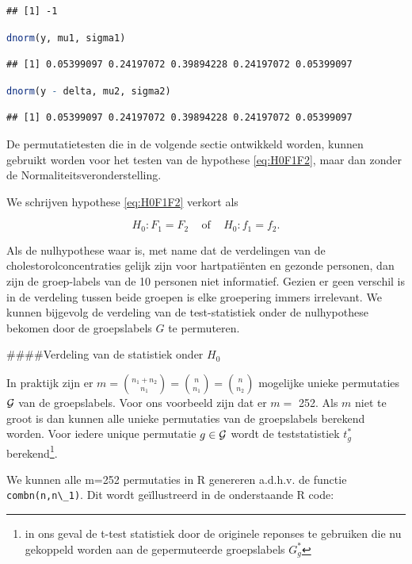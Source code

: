 \documentclass[
  12pt,dutch,coursenotes]{book}
\newcommand{\passthrough}[1]{#1}
\theoremstyle{definition}
\theoremstyle{definition}
\theoremstyle{definition}
\theoremstyle{definition}
\theoremstyle{remark}
\begin{document}
\begin{lstlisting}
## [1] -1
\end{lstlisting}

\begin{lstlisting}[language=R]
dnorm(y, mu1, sigma1)
\end{lstlisting}

\begin{lstlisting}
## [1] 0.05399097 0.24197072 0.39894228 0.24197072 0.05399097
\end{lstlisting}

\begin{lstlisting}[language=R]
dnorm(y - delta, mu2, sigma2)
\end{lstlisting}

\begin{lstlisting}
## [1] 0.05399097 0.24197072 0.39894228 0.24197072 0.05399097
\end{lstlisting}

De permutatietesten die in de volgende sectie ontwikkeld worden, kunnen gebruikt worden voor het testen van de hypothese \eqref{eq:H0F1F2}, maar dan zonder de Normaliteitsveronderstelling.

We schrijven hypothese \eqref{eq:H0F1F2} verkort als

\[
  H_0: F_1=F_2 \;\;\;\text{ of }\;\;\; H_0:f_1=f_2.
\]

Als de nulhypothese waar is, met name dat de verdelingen van de cholestorolconcentraties gelijk zijn voor hartpatiënten en gezonde personen, dan zijn de groep-labels van de 10 personen niet informatief.
Gezien er geen verschil is in de verdeling tussen beide groepen is elke groepering immers irrelevant.
We kunnen bijgevolg de verdeling van de test-statistiek onder de nulhypothese bekomen door de groepslabels \(G\) te permuteren.

\#\#\#\#Verdeling van de statistiek onder \(H_0\)

In praktijk zijn er \(m=\binom{n_1+n_2}{n_1}=\binom{n}{n_1}=\binom{n}{n_2}\) mogelijke unieke permutaties \(\cal{G}\) van de groepslabels.
Voor ons voorbeeld zijn dat er \(m=\) 252.
Als \(m\) niet te groot is dan kunnen alle unieke permutaties van de groepslabels berekend worden.
Voor iedere unique permutatie \(g \in \cal{G}\) wordt de teststatistiek \(t^*_g\) berekend\footnote{in ons geval de t-test statistiek door de originele reponses te gebruiken die nu gekoppeld worden aan de gepermuteerde groepslabels \(G_g^*\)}.

We kunnen alle m=252 permutaties in R genereren a.d.h.v. de functie \passthrough{\lstinline!combn(n,n\_1)!}.
Dit wordt geïllustreerd in de onderstaande R code:
\end{document}
